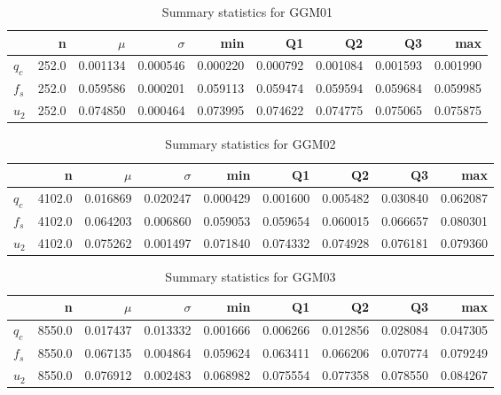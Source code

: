\begin{table}[h]
\caption{Summary statistics for GGM01}
\begin{tabular}{lrrrrrrrr}
\toprule
{} &      n &     $\mu$ &  $\sigma$ &       min &        Q1 &        Q2 &        Q3 &       max \\
\midrule
$q_c$ &  252.0 &  0.001134 &  0.000546 &  0.000220 &  0.000792 &  0.001084 &  0.001593 &  0.001990 \\
$f_s$ &  252.0 &  0.059586 &  0.000201 &  0.059113 &  0.059474 &  0.059594 &  0.059684 &  0.059985 \\
$u_2$ &  252.0 &  0.074850 &  0.000464 &  0.073995 &  0.074622 &  0.074775 &  0.075065 &  0.075875 \\
\bottomrule
\end{tabular}
\end{table}

\begin{table}[h]
\caption{Summary statistics for GGM02}
\begin{tabular}{lrrrrrrrr}
\toprule
{} &       n &     $\mu$ &  $\sigma$ &       min &        Q1 &        Q2 &        Q3 &       max \\
\midrule
$q_c$ &  4102.0 &  0.016869 &  0.020247 &  0.000429 &  0.001600 &  0.005482 &  0.030840 &  0.062087 \\
$f_s$ &  4102.0 &  0.064203 &  0.006860 &  0.059053 &  0.059654 &  0.060015 &  0.066657 &  0.080301 \\
$u_2$ &  4102.0 &  0.075262 &  0.001497 &  0.071840 &  0.074332 &  0.074928 &  0.076181 &  0.079360 \\
\bottomrule
\end{tabular}
\end{table}

\begin{table}[h]
\caption{Summary statistics for GGM03}
\begin{tabular}{lrrrrrrrr}
\toprule
{} &       n &     $\mu$ &  $\sigma$ &       min &        Q1 &        Q2 &        Q3 &       max \\
\midrule
$q_c$ &  8550.0 &  0.017437 &  0.013332 &  0.001666 &  0.006266 &  0.012856 &  0.028084 &  0.047305 \\
$f_s$ &  8550.0 &  0.067135 &  0.004864 &  0.059624 &  0.063411 &  0.066206 &  0.070774 &  0.079249 \\
$u_2$ &  8550.0 &  0.076912 &  0.002483 &  0.068982 &  0.075554 &  0.077358 &  0.078550 &  0.084267 \\
\bottomrule
\end{tabular}
\end{table}

